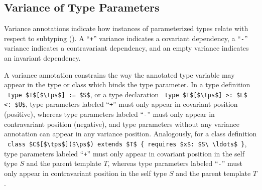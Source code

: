 \subsection{Variance of Type Parameters}
\label{sec:variance-of-type-parameters}

Variance annotations indicate how instances of parameterized types relate with respect to subtyping (). A ``\lstinline!+!'' variance indicates a covariant dependency, a ``\lstinline!-!'' variance indicates a contravariant dependency, and an empty variance indicates an invariant dependency. 

A variance annotation constrains the way the annotated type variable may appear in the type or class which binds the type parameter. In a type definition ~\lstinline!type $T$[$\tps$] := $S$!, or a type declaration ~\lstinline!type $T$[$\tps$] >: $L$ <: $U$!, type parameters labeled ``\lstinline!+!'' must only appear in covariant position (positive), whereas type parameters labeled ``\lstinline!-!'' must only appear in contravariant position (negative), and type parameters without any variance annotation can appear in any variance position. Analogously, for a class definition ~\lstinline!class $C$[$\tps$]($\ps$) extends $T$ { requires $x$: $S\ \ldots$ }!, type parameters labeled ``\lstinline!+!'' must only appear in covariant position in the self type $S$ and the parent template $T$, whereas type parameters labeled ``\lstinline!-!'' must only appear in contravariant position in the self type $S$ and the parent template $T$.

